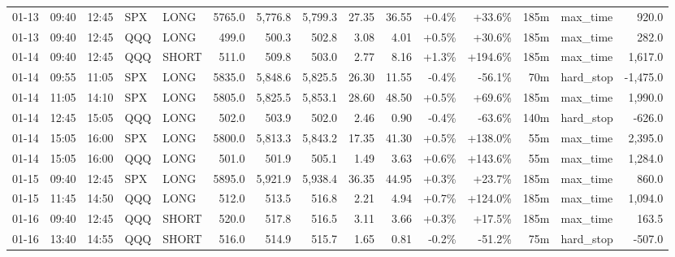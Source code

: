 \documentclass[11pt,a4paper,twoside]{article}
\begin{document}
\begin{landscape}
\begin{center}
\begin{longtable}{>{\color{txtmain}}l l l l l r r r r r r r r >{\color{txtmain}}l r}
01-13 & 09:40 & 12:45 & SPX & LONG & 5765.0 & 5,776.8 & 5,799.3 & 27.35 & 36.55 & \textcolor{wingreen}{+0.4\%} & \textcolor{wingreen}{+33.6\%} & 185m & max\_time & \textcolor{wingreen}{920.0} \\
01-13 & 09:40 & 12:45 & QQQ & LONG & 499.0 & 500.3 & 502.8 & 3.08 & 4.01 & \textcolor{wingreen}{+0.5\%} & \textcolor{wingreen}{+30.6\%} & 185m & max\_time & \textcolor{wingreen}{282.0} \\
01-14 & 09:40 & 12:45 & QQQ & SHORT & 511.0 & 509.8 & 503.0 & 2.77 & 8.16 & \textcolor{wingreen}{+1.3\%} & \textcolor{wingreen}{+194.6\%} & 185m & max\_time & \textcolor{wingreen}{1,617.0} \\
01-14 & 09:55 & 11:05 & SPX & LONG & 5835.0 & 5,848.6 & 5,825.5 & 26.30 & 11.55 & \textcolor{lossred}{-0.4\%} & \textcolor{lossred}{-56.1\%} & 70m & hard\_stop & \textcolor{lossred}{-1,475.0} \\
01-14 & 11:05 & 14:10 & SPX & LONG & 5805.0 & 5,825.5 & 5,853.1 & 28.60 & 48.50 & \textcolor{wingreen}{+0.5\%} & \textcolor{wingreen}{+69.6\%} & 185m & max\_time & \textcolor{wingreen}{1,990.0} \\
01-14 & 12:45 & 15:05 & QQQ & LONG & 502.0 & 503.9 & 502.0 & 2.46 & 0.90 & \textcolor{lossred}{-0.4\%} & \textcolor{lossred}{-63.6\%} & 140m & hard\_stop & \textcolor{lossred}{-626.0} \\
01-14 & 15:05 & 16:00 & SPX & LONG & 5800.0 & 5,813.3 & 5,843.2 & 17.35 & 41.30 & \textcolor{wingreen}{+0.5\%} & \textcolor{wingreen}{+138.0\%} & 55m & max\_time & \textcolor{wingreen}{2,395.0} \\
01-14 & 15:05 & 16:00 & QQQ & LONG & 501.0 & 501.9 & 505.1 & 1.49 & 3.63 & \textcolor{wingreen}{+0.6\%} & \textcolor{wingreen}{+143.6\%} & 55m & max\_time & \textcolor{wingreen}{1,284.0} \\
01-15 & 09:40 & 12:45 & SPX & LONG & 5895.0 & 5,921.9 & 5,938.4 & 36.35 & 44.95 & \textcolor{wingreen}{+0.3\%} & \textcolor{wingreen}{+23.7\%} & 185m & max\_time & \textcolor{wingreen}{860.0} \\
01-15 & 11:45 & 14:50 & QQQ & LONG & 512.0 & 513.5 & 516.8 & 2.21 & 4.94 & \textcolor{wingreen}{+0.7\%} & \textcolor{wingreen}{+124.0\%} & 185m & max\_time & \textcolor{wingreen}{1,094.0} \\
01-16 & 09:40 & 12:45 & QQQ & SHORT & 520.0 & 517.8 & 516.5 & 3.11 & 3.66 & \textcolor{wingreen}{+0.3\%} & \textcolor{wingreen}{+17.5\%} & 185m & max\_time & \textcolor{wingreen}{163.5} \\
01-16 & 13:40 & 14:55 & QQQ & SHORT & 516.0 & 514.9 & 515.7 & 1.65 & 0.81 & \textcolor{lossred}{-0.2\%} & \textcolor{lossred}{-51.2\%} & 75m & hard\_stop & \textcolor{lossred}{-507.0} \\

\end{longtable}
\end{center}
\end{landscape}
\end{document}
